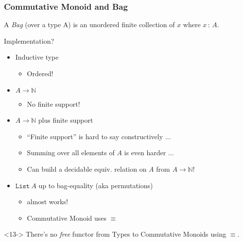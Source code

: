 \documentclass[serif,mathserif,professionalfont,10pt]{beamer}
\begin{document}
\begin{frame}
\frametitle{Commutative Monoid and Bag}
\begin{definition}
A \emph{Bag} (over a type A) is an unordered finite collection
of $x$ where $x\,:\,A$.
\end{definition}
\pause
Implementation?
\begin{itemize}
\item<2-> Inductive type
\begin{itemize}
\item<3-> Ordered!
\end{itemize}
\item<4-> $A \rightarrow \mathbb{N}$
\begin{itemize}
\item<5-> No finite support!
\end{itemize}
\item<6-> $A \rightarrow \mathbb{N}$ plus finite support
\begin{itemize}
\item<7-> ``Finite support'' is hard to say constructively $\ldots$
\item<8-> Summing over all elements of $A$ is even harder $\ldots$
\item<9-> Can build a decidable equiv. relation on $A$ from $A \rightarrow \mathbb{N}$!
\end{itemize}
\item<10-> $\texttt{List}\ A$ up to bag-equality (aka permutations)
\begin{itemize}
\item<11-> almost works!
\item<12-> Commutative Monoid uses $\equiv$
\end{itemize}
\end{itemize}
\begin{theorem}<13->
  There's no \emph{free} functor from Types to Commutative Monoids using $\equiv$.
\end{theorem}
\end{frame}
\end{document}
